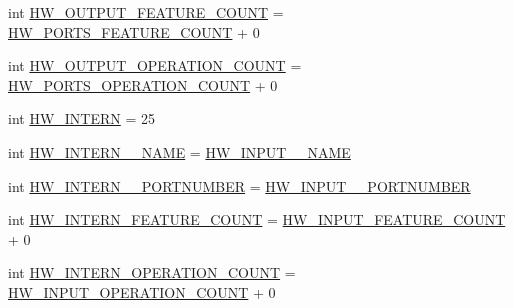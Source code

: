 \begin{DoxyCompactItemize}
\item 
int \hyperlink{interfaceshootingmachineemfmodel_1_1_shootingmachineemfmodel_package_aefdcd2b83d8884b60a471a861146421f}{H\-W\-\_\-\-O\-U\-T\-P\-U\-T\-\_\-\-F\-E\-A\-T\-U\-R\-E\-\_\-\-C\-O\-U\-N\-T} = \hyperlink{interfaceshootingmachineemfmodel_1_1_shootingmachineemfmodel_package_a07e6faf7371ad8351da3b4600954f204}{H\-W\-\_\-\-P\-O\-R\-T\-S\-\_\-\-F\-E\-A\-T\-U\-R\-E\-\_\-\-C\-O\-U\-N\-T} + 0
\item 
int \hyperlink{interfaceshootingmachineemfmodel_1_1_shootingmachineemfmodel_package_a911c6904fe8043130ce479d0e1d2e0b6}{H\-W\-\_\-\-O\-U\-T\-P\-U\-T\-\_\-\-O\-P\-E\-R\-A\-T\-I\-O\-N\-\_\-\-C\-O\-U\-N\-T} = \hyperlink{interfaceshootingmachineemfmodel_1_1_shootingmachineemfmodel_package_a5f85f99a2b80ea1b9f8c81dc620e69b3}{H\-W\-\_\-\-P\-O\-R\-T\-S\-\_\-\-O\-P\-E\-R\-A\-T\-I\-O\-N\-\_\-\-C\-O\-U\-N\-T} + 0
\item 
int \hyperlink{interfaceshootingmachineemfmodel_1_1_shootingmachineemfmodel_package_a0ff0aa7656387125821862056ec11ca9}{H\-W\-\_\-\-I\-N\-T\-E\-R\-N} = 25
\item 
int \hyperlink{interfaceshootingmachineemfmodel_1_1_shootingmachineemfmodel_package_a9b9bd65de59c357ad73e62c76be9b4dc}{H\-W\-\_\-\-I\-N\-T\-E\-R\-N\-\_\-\-\_\-\-N\-A\-M\-E} = \hyperlink{interfaceshootingmachineemfmodel_1_1_shootingmachineemfmodel_package_aca3df42c3daea63181ee2a2aa5ed1fac}{H\-W\-\_\-\-I\-N\-P\-U\-T\-\_\-\-\_\-\-N\-A\-M\-E}
\item 
int \hyperlink{interfaceshootingmachineemfmodel_1_1_shootingmachineemfmodel_package_a5e3789ada86b1c7b8900abdc8f386a9f}{H\-W\-\_\-\-I\-N\-T\-E\-R\-N\-\_\-\-\_\-\-P\-O\-R\-T\-N\-U\-M\-B\-E\-R} = \hyperlink{interfaceshootingmachineemfmodel_1_1_shootingmachineemfmodel_package_ac54ab200e6b01aa749998ba59d67d36b}{H\-W\-\_\-\-I\-N\-P\-U\-T\-\_\-\-\_\-\-P\-O\-R\-T\-N\-U\-M\-B\-E\-R}
\item 
int \hyperlink{interfaceshootingmachineemfmodel_1_1_shootingmachineemfmodel_package_a0c7497ff6a6c4b983c5591ef81938513}{H\-W\-\_\-\-I\-N\-T\-E\-R\-N\-\_\-\-F\-E\-A\-T\-U\-R\-E\-\_\-\-C\-O\-U\-N\-T} = \hyperlink{interfaceshootingmachineemfmodel_1_1_shootingmachineemfmodel_package_a535000a6deb669d11da173c3d44815a2}{H\-W\-\_\-\-I\-N\-P\-U\-T\-\_\-\-F\-E\-A\-T\-U\-R\-E\-\_\-\-C\-O\-U\-N\-T} + 0
\item 
int \hyperlink{interfaceshootingmachineemfmodel_1_1_shootingmachineemfmodel_package_adbbe73334258683c2c965998d0696d81}{H\-W\-\_\-\-I\-N\-T\-E\-R\-N\-\_\-\-O\-P\-E\-R\-A\-T\-I\-O\-N\-\_\-\-C\-O\-U\-N\-T} = \hyperlink{interfaceshootingmachineemfmodel_1_1_shootingmachineemfmodel_package_af19839a18788f1df9c7076b1f331b660}{H\-W\-\_\-\-I\-N\-P\-U\-T\-\_\-\-O\-P\-E\-R\-A\-T\-I\-O\-N\-\_\-\-C\-O\-U\-N\-T} + 0

\end{DoxyCompactItemize}

